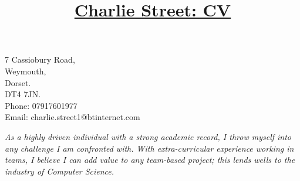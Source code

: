 \documentclass[11pt]{article}
\title{\vspace{-80pt}\underline{Charlie Street: CV}}
\date{}
\begin{document}
	\maketitle
	\begin{center}
		\vspace*{-40pt}
		\large7 Cassiobury Road,\\
		\large Weymouth,\\
		\large Dorset.\\
		\large DT4 7JN.\\	
		\large Phone: 07917601977\\
                     \large Email: charlie.street1@btinternet.com \\
	\end{center}

	\vspace{7pt}
	\begin{center}
			\textit{\large As a highly driven individual with a strong academic record, I throw myself into any challenge I am confronted with. With extra-curricular experience working in teams, I believe I can add value to any team-based project; this lends wells to the industry of Computer Science.}
	\end{center}
			
\end{document}
